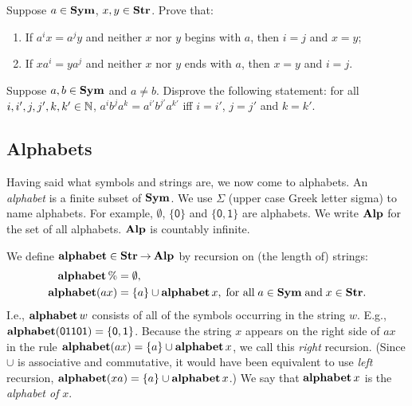 \begin{exercise}
Suppose $a\in\mathbf{Sym}$, $x,y\in\mathbf{Str}$. Prove that:
\begin{enumerate}[(1)]
\item If $a^ix = a^jy$ and neither $x$ nor $y$ begins with $a$,
then $i=j$ and $x=y$;

\item If $xa^i = ya^j$ and neither $x$ nor $y$ ends with $a$,
then $x=y$ and $i=j$.
\end{enumerate}
\end{exercise}

\begin{exercise}
Suppose $a,b\in\mathbf{Sym}$ and $a\neq b$. Disprove the following statement:
for all $i, i', j, j', k, k'\in\mathbb{N}$, $a^i b^j a^k = a^{i'} b^{j'} a^{k'}$
iff $i = i'$, $j = j'$ and $k = k'$.
\end{exercise}

%

\subsection{Alphabets}

%
Having said what symbols and strings are, we now come to alphabets.
An \emph{alphabet}
%
is a finite subset of $\mathbf{Sym}$.  We use $\Sigma$
%
%
(upper case Greek letter sigma) to name alphabets.  For example,
$\emptyset$, $\mathsf{\{0\}}$ and $\mathsf{\{0,1\}}$ are alphabets.
We write $\mathbf{Alp}$ for the set of all alphabets.  $\mathbf{Alp}$ is countably
infinite.
%

We define $\mathbf{alphabet}\in\mathbf{Str}\mathbin{\to}\mathbf{Alp}$
%
%
%
by recursion
%
%
%
on (the length of) strings:
\begin{align*}
\mathbf{alphabet}\,\% &= \emptyset , \\
\mathbf{alphabet}(ax) &= \{a\} \cup \mathbf{alphabet}\,x,
\;\allowbreak\mbox{for all}\allowbreak\;a\in\mathbf{Sym}\;\allowbreak\mbox{and}\allowbreak\;x\in\mathbf{Str} .
\end{align*}
I.e., $\mathbf{alphabet}\,w$ consists of all of the symbols occurring in the
string $w$.  E.g., $\mathbf{alphabet}(\mathsf{01101})=\{\mathsf{0},\mathsf{1}\}$.
Because the string $x$ appears on the right side of $ax$ in the rule
$\mathbf{alphabet}(ax) = \{a\} \cup \mathbf{alphabet}\,x$, we call this \emph{right}
recursion.  (Since $\cup$ is associative and commutative, it would
have been equivalent to use \emph{left} recursion, $\mathbf{alphabet}(xa) =
\{a\} \cup \mathbf{alphabet}\,x$.)  We say that $\mathbf{alphabet}\,x$ is the
\emph{alphabet of} $x$.

